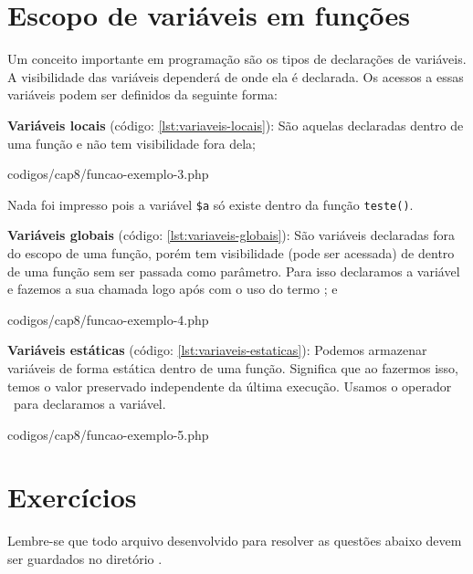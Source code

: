 \section{Escopo de variáveis em funções}
\label{escopo-de-variaveis-em-funcoes}

Um conceito importante em programação são os tipos de declarações de variáveis.
A visibilidade das variáveis dependerá de onde ela é declarada. Os acessos a essas 
variáveis podem ser definidos da seguinte forma:

\textbf{Variáveis locais} (código: \ref{lst:variaveis-locais}): São aquelas 
  declaradas dentro de uma função e não tem visibilidade fora dela;


{codigos/cap8/funcao-exemplo-3.php}

Nada foi impresso pois a variável \texttt{\$a} só existe dentro da função \texttt{teste()}.

\textbf{Variáveis globais} (código: \ref{lst:variaveis-globais}): São variáveis 
  declaradas fora do escopo de uma função, porém tem visibilidade (pode ser acessada) 
  de dentro de uma função sem ser passada como parâmetro. Para isso declaramos a 
  variável e fazemos a sua chamada logo após com o uso do termo \comandoglobal; e


{codigos/cap8/funcao-exemplo-4.php}

\textbf{Variáveis estáticas} (código: \ref{lst:variaveis-estaticas}): Podemos 
  armazenar variáveis de forma estática dentro de uma função. Significa que ao 
  fazermos isso, temos o valor preservado independente da última execução. 
  Usamos o operador \comandostatic~para declaramos a variável. 


{codigos/cap8/funcao-exemplo-5.php}

\section{Exercícios}
\label{cap8-exercicios}
Lembre-se que todo arquivo desenvolvido para resolver as questões abaixo devem ser
guardados no diretório .

